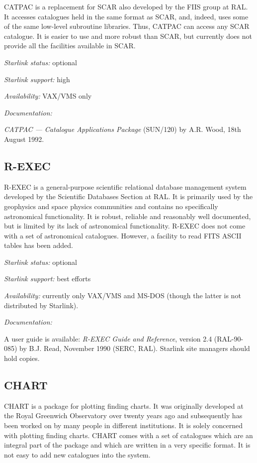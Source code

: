 \documentclass[twoside,11pt]{article}
\newcommand{\xref}[3]{#1}
\newcommand{\xlabel}[1]{}
\begin{document}
CATPAC is a replacement for SCAR also developed by the FIIS group at
RAL. It accesses catalogues held in the same format as SCAR, and, 
indeed, uses some of the same low-level subroutine libraries. Thus, 
CATPAC can access any SCAR catalogue. It is easier to use and more 
robust than SCAR, but currently does not provide all the facilities 
available in SCAR.

{\it Starlink status:} optional

{\it Starlink support:} high

{\it Availability:} VAX/VMS only

{\it Documentation:}

{\it CATPAC --- Catalogue Applications Package}
\xref{(SUN/120}{sun120}{}) by A.R. Wood,
18th August 1992.

\subsection{R-EXEC\xlabel{rexec}}

R-EXEC is a general-purpose scientific relational database management 
system developed by the Scientific Databases Section at RAL. It is 
primarily used by the geophysics and space physics communities and 
contains no specifically astronomical functionality. It is robust, 
reliable and reasonably well documented, but is limited by its lack of 
astronomical functionality. R-EXEC does not come with a set of 
astronomical catalogues. However, a facility to read FITS ASCII tables 
has been added.

{\it Starlink status:} optional

{\it Starlink support:} best efforts

{\it Availability: } currently only VAX/VMS and MS-DOS (though the 
latter is not distributed by Starlink).

{\it Documentation: }

A user guide is available: {\it R-EXEC Guide and Reference}, version 
2.4 (RAL-90-085) by B.J. Read, November 1990 (SERC, RAL). Starlink site
managers should hold copies.

\subsection{CHART\xlabel{chart}}

CHART is a package for plotting finding charts. It was originally 
developed at the Royal Greenwich Observatory over twenty years ago and
subsequently has been worked on by many people in different 
institutions. It is solely concerned with plotting finding charts. CHART
comes with a set of catalogues which are an integral part of the package
and which are written in a very specific format. It is not easy to add 
new catalogues into the system.
\end{document}
